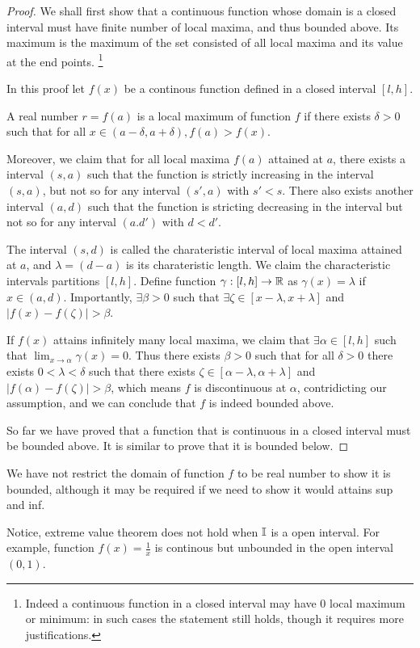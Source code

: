 \documentclass[../note.tex]{subfiles}
\begin{document}
\begin{proof}
	We shall first show that a continuous function whose domain is a closed interval must have finite number of local maxima, and thus bounded above. Its maximum is the maximum of the set consisted of all local maxima and its value at the end points. 
	\footnote{
		Indeed a continuous function in a closed interval may have 0 local maximum or minimum: in such cases the statement still holds, though it requires more justifications.
	}

	In this proof let $f(x)$ be a continous function defined in a closed interval $[l, h]$.

	A real number $r = f(a)$ is a local maximum of function $f$ if there exists $\delta > 0$ such that for all $x \in(a-\delta, a+\delta), f(a)>f(x)$. 

	Moreover, we claim that for all local maxima $f(a)$ attained at $a$, there exists a interval $(s, a)$  such that the function is strictly increasing in the interval $(s,a)$, but not so for any interval $(s', a)$ with $s'<s$. 
	There also exists another interval $(a, d)$ such that the function is stricting decreasing in the interval but not so for any interval $(a. d')$ with $d<d'$.

	The interval $(s,d)$ is called the charateristic interval of local maxima attained at $a$, and $\lambda = (d-a)$ is its charateristic length. 
	We claim the characteristic intervals partitions $[l,h]$.
	Define function $\gamma: [l,h] \rightarrow \mathbb{R}$ as $\gamma(x) = \lambda$ if $x\in (a,d)$. Importantly, $\exists \beta > 0$ such that $\exists \zeta \in [x-\lambda,x+\lambda]$ and $|f(x)-f(\zeta)|>\beta$.
	
	If $f(x)$ attains infinitely many local maxima, we claim that $\exists \alpha \in [l, h]$ such that $\displaystyle \lim_{x\to \alpha} \gamma (x) = 0$.
	Thus there exists $\beta > 0$ such that for all $\delta>0$ there exists $0<\lambda<\delta$ such that there exists $\zeta \in [\alpha-\lambda, \alpha+\lambda]$ and $|f(\alpha)-f(\zeta)|>\beta$, which means $f$ is discontinuous at $\alpha$, contridicting our assumption, and we can conclude that $f$ is indeed bounded above.

	So far we have proved that a function that is continuous in a closed interval must be bounded above. It is similar to prove that it is bounded below.
\end{proof}

\begin{remark}
	We have not restrict the domain of function $f$ to be real number to show it is bounded, although it may be required if we need to show it would attains sup and inf.

	Notice, extreme value theorem does not hold when $\mathbb{I}$ is a open interval. For example, function $f(x)=\frac{1}{x}$ is continous but unbounded in the open interval $(0,1)$.
\end{remark}
\end{document}
